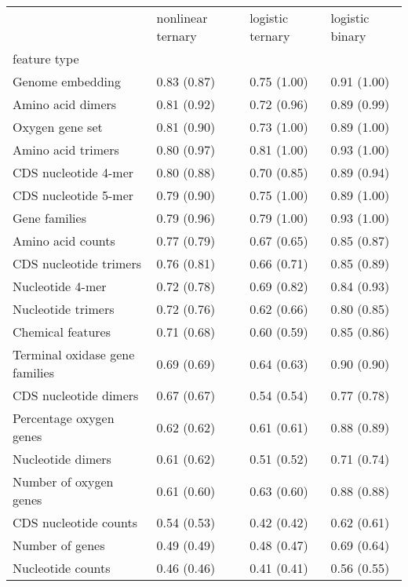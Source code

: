 \begin{tabular}{llll}
\toprule
 & nonlinear ternary & logistic ternary & logistic binary \\
feature type &  &  &  \\
\midrule
Genome embedding & 0.83 (0.87) & 0.75 (1.00) & 0.91 (1.00) \\
Amino acid dimers & 0.81 (0.92) & 0.72 (0.96) & 0.89 (0.99) \\
Oxygen gene set & 0.81 (0.90) & 0.73 (1.00) & 0.89 (1.00) \\
Amino acid trimers & 0.80 (0.97) & 0.81 (1.00) & 0.93 (1.00) \\
CDS nucleotide 4-mer & 0.80 (0.88) & 0.70 (0.85) & 0.89 (0.94) \\
CDS nucleotide 5-mer & 0.79 (0.90) & 0.75 (1.00) & 0.89 (1.00) \\
Gene families & 0.79 (0.96) & 0.79 (1.00) & 0.93 (1.00) \\
Amino acid counts & 0.77 (0.79) & 0.67 (0.65) & 0.85 (0.87) \\
CDS nucleotide trimers & 0.76 (0.81) & 0.66 (0.71) & 0.85 (0.89) \\
Nucleotide 4-mer & 0.72 (0.78) & 0.69 (0.82) & 0.84 (0.93) \\
Nucleotide trimers & 0.72 (0.76) & 0.62 (0.66) & 0.80 (0.85) \\
Chemical features & 0.71 (0.68) & 0.60 (0.59) & 0.85 (0.86) \\
Terminal oxidase gene families & 0.69 (0.69) & 0.64 (0.63) & 0.90 (0.90) \\
CDS nucleotide dimers & 0.67 (0.67) & 0.54 (0.54) & 0.77 (0.78) \\
Percentage oxygen genes & 0.62 (0.62) & 0.61 (0.61) & 0.88 (0.89) \\
Nucleotide dimers & 0.61 (0.62) & 0.51 (0.52) & 0.71 (0.74) \\
Number of oxygen genes & 0.61 (0.60) & 0.63 (0.60) & 0.88 (0.88) \\
CDS nucleotide counts & 0.54 (0.53) & 0.42 (0.42) & 0.62 (0.61) \\
Number of genes & 0.49 (0.49) & 0.48 (0.47) & 0.69 (0.64) \\
Nucleotide counts & 0.46 (0.46) & 0.41 (0.41) & 0.56 (0.55) \\
\bottomrule
\end{tabular}
